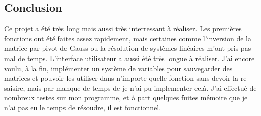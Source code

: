 \documentclass[a4paper,11pt,DIV=11]{scrartcl}
\begin{document}
\begin{onehalfspace}
    \section*{Conclusion}

    Ce projet a été très long mais aussi très interressant à réaliser. Les premières fonctions ont été
    faites assez rapidement, mais certaines comme l'inversion de la matrice par pivot de Gauss ou la résolution
    de systèmes linéaires m'ont pris pas mal de temps. L'interface utilisateur a aussi été très longue à
    réaliser. J'ai encore voulu, à la fin,  implémenter un système de variables pour sauvegarder des matrices
    et pouvoir les utiliser dans n'importe quelle fonction sans devoir la re-saisire, mais par manque de temps
    de je n'ai pu implementer celà. J'ai effectué de nombreux testes sur mon programme, et à part quelques
    fuites mémoire que je n'ai pas eu le temps de résoudre, il est fonctionnel.


\end{onehalfspace}
\end{document}
